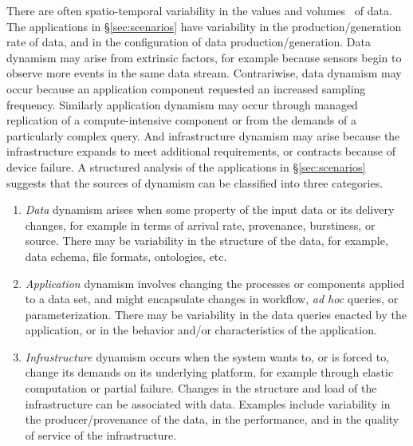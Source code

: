 There are often spatio-temporal variability in the values and
volumes~\cite{deRoos2011UnderstandingBigData} of data.  The
applications in \S\ref{sec:scenarios} have variability in the
production/generation rate of data, and in the configuration of data
production/generation.  Data dynamism may arise from extrinsic
factors, for example because sensors begin to observe more events in
the same data stream. Contrariwise, data dynamism may occur because an
application component requested an increased sampling frequency.
Similarly application dynamism may occur through managed replication
of a compute-intensive component or from the demands of a particularly
complex query. And infrastructure dynamism may arise because the
infrastructure expands to meet additional requirements, or contracts
because of device failure.  A structured analysis of the applications
in \S\ref{sec:scenarios} suggests that the sources of dynamism can be
classified into three categories.
\begin{enumerate}

\item \emph{Data} dynamism arises when some property of the input data
  or its delivery changes, for example in terms of arrival rate,
  provenance, burstiness, or source.  There may be variability in the
  structure of the data, for example, data schema, file formats,
  ontologies, etc.


\item  %
  \emph{Application} dynamism
  involves changing the processes or components applied to a data set,
  and might encapsulate changes in workflow, \textit{ad hoc} queries,
  or parameterization.  There may be variability in the data queries
  enacted by the application, or in the behavior
  and/or characteristics of the
  application.  %

\item \emph{Infrastructure} dynamism occurs when the system wants to,
  or is forced to, change its demands on its underlying platform, for
  example through elastic computation or partial failure.  Changes in
  the structure and load of the infrastructure can be associated with data.
  Examples include variability in the producer/provenance of the data,
  in the performance, and in the quality of service of the
  infrastructure.

\end{enumerate}

